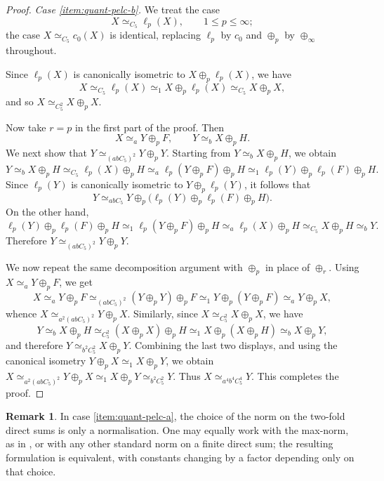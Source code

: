 \documentclass[11pt]{amsart}
\theoremstyle{plain}
\theoremstyle{definition}
\newtheorem{remark}[theorem]{Remark}
\numberwithin{equation}{section}
\renewcommand{\le}{\leqslant}
\begin{document}
\begin{proof}
\smallskip
\noindent
\textit{Case \ref{item:quant-pelc-b}.}
We treat the case
\[
    X \simeq_{C_5} \ell_p(X),
    \qquad 1 \le p \le \infty;
\]
the case $X \simeq_{C_5} c_0(X)$ is identical, replacing $\ell_p$ by $c_0$ and $\oplus_p$ by $\oplus_\infty$ throughout.

Since $\ell_p(X)$ is canonically isometric to $X \oplus_p \ell_p(X)$, we have
\[
    X \simeq_{C_5} \ell_p(X)
    \simeq_1 X \oplus_p \ell_p(X)
    \simeq_{C_5} X \oplus_p X,
\]
and so
\(
    X \simeq_{C_5^2} X \oplus_p X.
\)

Now take $r=p$ in the first part of the proof.
Then
\[
    X \simeq_a Y \oplus_p F,
    \qquad
    Y \simeq_b X \oplus_p H.
\]
We next show that
\(
    Y \simeq_{(abC_5)^2} Y \oplus_p Y.
\)
Starting from $Y \simeq_b X \oplus_p H$, we obtain
\[
    Y \simeq_b X \oplus_p H
    \simeq_{C_5} \ell_p(X)\oplus_p H
    \simeq_a \ell_p(Y \oplus_p F)\oplus_p H
    \simeq_1 \ell_p(Y)\oplus_p \ell_p(F)\oplus_p H.
\]
Since $\ell_p(Y)$ is canonically isometric to $Y \oplus_p \ell_p(Y)$, it follows that
\[
    Y \simeq_{abC_5} Y \oplus_p \bigl(\ell_p(Y)\oplus_p \ell_p(F)\oplus_p H\bigr).
\]
On the other hand,
\[
    \ell_p(Y)\oplus_p \ell_p(F)\oplus_p H
    \simeq_1 \ell_p(Y \oplus_p F)\oplus_p H
    \simeq_a \ell_p(X)\oplus_p H
    \simeq_{C_5} X \oplus_p H
    \simeq_b Y.
\]
Therefore
\(
    Y \simeq_{(abC_5)^2} Y \oplus_p Y.
\)

We now repeat the same decomposition argument with $\oplus_p$ in place of $\oplus_r$.
Using $X \simeq_a Y \oplus_p F$, we get
\[
    X \simeq_a Y \oplus_p F
    \simeq_{(abC_5)^2} (Y \oplus_p Y)\oplus_p F
    \simeq_1 Y \oplus_p (Y \oplus_p F)
    \simeq_a Y \oplus_p X,
\]
whence
\(
    X \simeq_{a^2(abC_5)^2} Y \oplus_p X.
\)
Similarly, since $X \simeq_{C_5^2} X \oplus_p X$, we have
\[
    Y \simeq_b X \oplus_p H
    \simeq_{C_5^2} (X \oplus_p X)\oplus_p H
    \simeq_1 X \oplus_p (X \oplus_p H)
    \simeq_b X \oplus_p Y,
\]
and therefore
\(
    Y \simeq_{b^2C_5^2} X \oplus_p Y.
\)
Combining the last two displays, and using the canonical isometry $Y \oplus_p X \simeq_1 X \oplus_p Y$, we obtain
\(
    X \simeq_{a^2(abC_5)^2} Y \oplus_p X
    \simeq_1 X \oplus_p Y
    \simeq_{b^2C_5^2} Y.
\)
Thus $X \simeq_{a^4b^4C_5^4} Y$.
This completes the proof.
\end{proof}

\begin{remark}\label{rem:quant-pelc-norm}
In case \ref{item:quant-pelc-a}, the choice of the norm on the two-fold direct sums is only a normalisation.
One may equally work with the max-norm, as in \cite{KorpalskiPlebanek2025,KaniaLewicki2026}, or with any other standard norm on a finite direct sum; the resulting formulation is equivalent, with constants changing by a factor depending only on that choice.
\end{remark}
\end{document}
